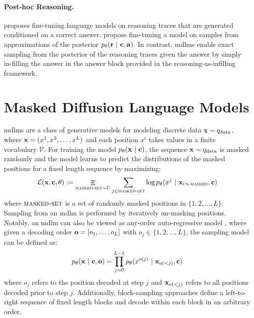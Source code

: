 \paragraph{Post-hoc Reasoning.}
\citet{zelikman2022star} proposes fine-tuning language models on reasoning traces that are generated conditioned on a correct answer. \citet{phan2023training,ruan2025reasoning} propose fine-tuning a model on samples from approximations of the posterior $p_\theta(\mathbf{r} ~\vert~ \mathbf{c}, \mathbf{a})$. In contrast, \glspl{mdlm} enable exact sampling from the posterior of the reasoning traces given the answer by simply in-filling the answer in the answer block provided in the {reasoning-as-infilling} framework.

\section{Masked Diffusion Language Models}
\Glspl{mdlm} \citep{sohl2015deep,devlin2019bert,austin2021structured,sahoo2024simple,shi2024simplified} are a class of generative models for modeling discrete data $\mathbf{x} \sim q_{\text{data}}$, where $\mathbf{x} = (x^1, x^2, \dots, x^{L})$ and each position $x^i$ takes values in a finite vocabulary $\mathcal{V}$. For training the model $p_\theta(\mathbf{x} ~\vert~ \mathbf{c})$, the sequence $\mathbf{x} \sim q_{\text{data}}$ is masked randomly and the model learns to predict the distributions of the masked positions for a fixed length sequence by maximizing:
\begin{align}\label{eq:likelihood_bound}
 \mathcal{L}(\mathbf{x}, \mathbf{c}, \theta): = \mathop{\mathbb{E}}_{\textsc{masked-set} \sim U}  \sum_{j \in \textsc{masked-set}}  \log p_\theta( x^j ~\vert~ \mathbf{x}_{\textsc{un-masked}}, \mathbf{c})
\end{align}
where $\textsc{masked-set}$ is a set of randomly masked positions in $\{1, 2, \dots, L\} $. Sampling from an \gls{mdlm} is performed by iteratively un-masking positions. Notably, an \gls{mdlm} can also  be viewed as any-order auto-regressive model \citep{uria2014deep,ou2024your}, where given a decoding order $\mathbf{o} = [o_1, \dots, o_L]$ with $o_j \in \{1, 2, \dots, L \}$, the sampling model can be defined as:
\begin{align}
    p_\theta(\mathbf{x} ~\vert~ \mathbf{c}, \mathbf{o}) = \prod_{j=0}^{L-1} p_\theta(x^{o(j)} ~\vert~ \mathbf{x}_{o(<j)}, \mathbf{c}) 
\end{align}
where $o_j$ refers to the position decoded at step $j$ and $\mathbf{x}_{o(<j)}$ refers to all positions decoded prior to step $j$. Additionally, block-sampling \citep{sahoo2024simple,nie2025largelanguagediffusionmodels,arriola2025blockdiffusioninterpolatingautoregressive} approaches define a left-to-right sequence of fixed length blocks and decode within each block in  an arbitrary order. 
